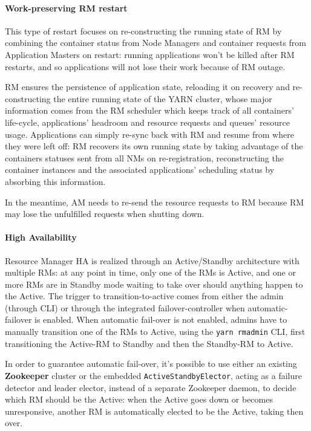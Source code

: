 \paragraph{Work-preserving RM restart} This type of restart focuses on re-constructing the running state of RM by combining the container status from Node Managers and container requests from Application Masters on restart: running applications won't be killed after RM restarts, and so applications will not lose their work because of RM outage. 

RM ensures the persistence of application state, reloading it on recovery and re-constructing the entire running state of the YARN cluster, whose major information comes from the RM scheduler which keeps track of all containers' life-cycle, applications' headroom and resource requests and queues' resource usage. 
Applications can simply re-sync back with RM and resume from where they were left off: RM recovers its own running state by taking advantage of the containers statuses sent from all NMs on re-registration, reconstructing the container instances and the associated applications' scheduling status by absorbing this information. 

In the meantime, AM needs to re-send the resource requests to RM because RM may lose the unfulfilled requests when shutting down.

\paragraph{High Availability} Resource Manager HA is realized through an Active/Standby architecture with multiple RMs: at any point in time, only one of the RMs is Active, and one or more RMs are in Standby mode waiting to take over should anything happen to the Active. The trigger to transition-to-active comes from either the admin (through CLI) or through the integrated failover-controller when automatic-failover is enabled. When automatic fail-over is not enabled, admins have to manually transition one of the RMs to Active, using the \texttt{yarn rmadmin} CLI, first transitioning the Active-RM to Standby and then the Standby-RM to Active.

In order to guarantee automatic fail-over, it's possible to use either an existing \textbf{Zoo\-keeper} cluster or the embedded \texttt{ActiveStandbyElector}, acting as a failure detector and leader elector, instead of a separate Zookeeper daemon, to decide which RM should be the Active: when the Active goes down or becomes unresponsive, another RM is automatically elected to be the Active, taking then over.

